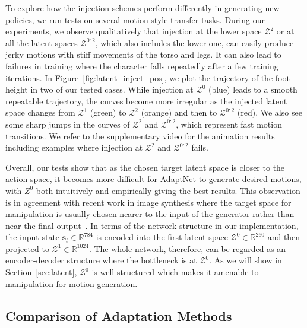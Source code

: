 To explore how the injection schemes perform 
differently in generating new policies,
we run tests on several motion style transfer tasks. %
During our experiments, we observe qualitatively that 
injection at the lower space $\mathcal{Z}^2$ or at all the latent spaces $\mathcal{Z}^{0:2}$,   which also includes the lower one, 
can easily 
produce jerky motions with stiff movements of the torso and legs. 
It can also lead to failures in training where the character falls repeatedly after a few training iterations. %
In Figure~\ref{fig:latent_inject_pos}, we plot the trajectory of the foot height in two of our tested cases.
While injection at $\mathcal{Z}^0$ (blue) leads to a smooth repeatable trajectory, %
the curves become more irregular as the injected latent space changes from $\mathcal{Z}^1$ (green) to $\mathcal{Z}^2$ (orange) and then to $\mathcal{Z}^{0:2}$ (red). 
We also see some sharp jumps in the curves of $\mathcal{Z}^2$ and $\mathcal{Z}^{0:2}$,
which represent fast motion transitions.
We refer to the supplementary video for the animation results including examples where injection at $\mathcal{Z}^2$ and $\mathcal{Z}^{0:2}$ fails.

Overall, our tests show that as the chosen target latent space is closer to the action space, it becomes more difficult for AdaptNet to generate desired motions, with $Z^0$ both intuitively and empirically giving the best results. 
This observation is in agreement with recent work in  
image synthesis where the target space for manipulation is usually chosen nearer to the input of the generator rather than near the final output~\cite{abdal2019image2stylegan,zhuang2021enjoy,karras2020analyzing}. 
In terms of the network structure in our implementation, 
the input state $\mathbf{s}_t \in \mathbb{R}^{784}$ is encoded into the first latent space $\mathcal{Z}^0 \in \mathbb{R}^{260}$ and then projected to $\mathcal{Z}^1 \in \mathbb{R}^{1024}$.
The whole network, therefore, can be regarded as an encoder-decoder structure where the bottleneck is at $\mathcal{Z}^0$.
As we will show in Section~\ref{sec:latent}, $\mathcal{Z}^0$ is well-structured 
which makes it amenable to manipulation %
for motion generation. 

\subsection{Comparison of Adaptation Methods}\label{sec:lora}




